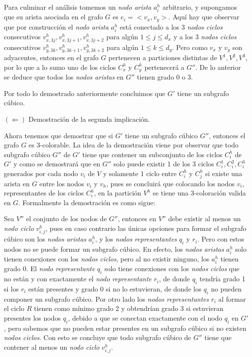 \documentclass{article}
\begin{document}
Para culminar el análisis tomemos un \textit{nodo arista} $a_i^h$ arbitrario, y supongamos que su arista asociada en el grafo $G$ es $e_i=<v_x,v_y>$. Aquí hay que observar
que por construcción el \textit{nodo arista} $a_i^h$ está conectado a los 3 \textit{nodos ciclos} consecutivos $v_{x,3j}^h, v_{x,3j+1}^h, v_{x,3j+2}^h$ para algún $1\leq j\leq d_x$ y a los 3
\textit{nodos ciclos} consecutivos $v_{y,3k}^h, v_{y,3k+1}^h, v_{y,3k+2}^h$ para algún $1\leq k\leq d_y$.
Pero como $v_x$ y $v_y$ son adyacentes, entonces en el grafo $G$ pertenecen a particiones distintas de $V^1,V^2,V^3$, por lo que a lo sumo uno de los ciclos $C_x^h$ y $C_y^h$ pertenecerá a $G''$.
De lo anterior se deduce que todos los \textit{nodos aristas} en $G''$ tienen grado 0 o 3.

Por todo lo demostrado anteriormente concluimos que $G'$ tiene un subgrafo cúbico.\newline

$(\Leftarrow)$ Demostración de la segunda implicación.

Ahora tenemos que demostrar que si $G'$ tiene un subgrafo cúbico $G''$, entonces el grafo $G$ es 3-colorable.
La idea de la demostración viene por observar que todo subgrafo cúbico $G''$ de $G'$ tiene que contener un subconjunto de los
ciclos $C_i^h$ de $G'$ y como se demostrará que en $G''$ solo puede existir 1 de los 3 ciclos $C_i^1, C_i^2,C_i^3$ generados por cada
nodo $v_i$ de $V$ y solamente 1 ciclo entre $C_i^h$ y $C_j^h$ si existe una arista en $G$ entre los nodos $v_i$ y $v_h$, pues se concluirá que colocando los nodos $v_i$, representantes de los ciclos $C_i^h$, en la partición $V^h$
se tiene una 3-coloración valida en $G$. Formalmente la demostración es como sigue:

Sea $V''$ el conjunto de los nodos de $G''$, entonces en $V''$ debe existir al menos un \textit{nodo ciclo} $v_{i,j}^h$, pues en caso contrario las únicas opciones
para formar el subgrafo cúbico son los \textit{nodos aristas} $a_i^h$, y los \textit{nodos representantes} $q_i$ y $r_i$. Pero con estos nodos no se puede formar un subgrafo cúbico.
En efecto, los \textit{nodos aristas} $a_i^h$ solo tienen conexiones con los \textit{nodos ciclos}, pero al no existir ninguno, los $a_i^h$ tienen grado 0.
El \textit{nodo representante} $q_i$ solo tiene conexiones con los \textit{nodos ciclos} que no están y con exactamente el \textit{nodo representante} $r_i$, de donde $q_i$ tendría grado 1
si los $r_i$ están presentes y grado 0 si no lo estuvieran, de donde los $q_i$ no pueden componer un subgrafo cúbico. Por otro lado los \textit{nodos representantes} $r_i$ al formar el ciclo $R$
tienen como mínimo grado 2 y obtendrían grado 3 si estuvieran presentes los nodos $q_i$, debido a que se conectan exactamente con el nodo $q_i$ en $G'$, pero sabemos que no pueden estar presentes en un subgrafo
cúbico si no existen \textit{nodos ciclos}.
Con esto se concluye que todo subgrafo cúbico de $G''$ tiene que contener al menos un \textit{nodo ciclo} $v_{i,j}^h$.
\end{document}
